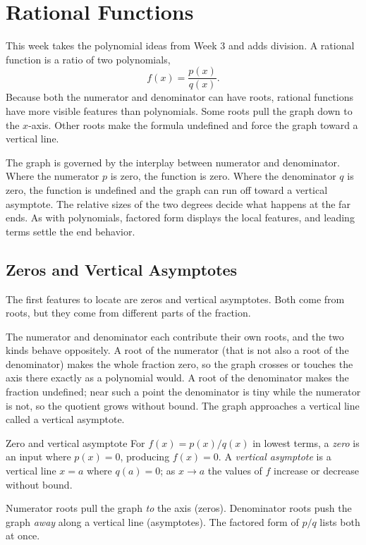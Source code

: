 \documentclass[12pt]{book}
\begin{document}
\chapter{Rational Functions}

This week takes the polynomial ideas from Week 3 and adds division. A rational
function is a ratio of two polynomials,
\[
f(x)=\frac{p(x)}{q(x)}.
\]
Because both the numerator and denominator can have roots, rational functions have
more visible features than polynomials. Some roots pull the graph down to the
$x$-axis. Other roots make the formula undefined and force the graph toward a
vertical line.

The graph is governed by the interplay between numerator and denominator. Where the
numerator $p$ is zero, the function is zero. Where the denominator $q$ is zero, the
function is undefined and the graph can run off toward a vertical asymptote. The
relative sizes of the two degrees decide what happens at the far ends. As with
polynomials, factored form displays the local features, and leading terms settle the
end behavior.

\section{Zeros and Vertical Asymptotes}

The first features to locate are zeros and vertical asymptotes. Both come from roots,
but they come from different parts of the fraction.

The numerator and denominator each contribute their own roots, and the two kinds
behave oppositely. A root of the numerator (that is not also a root of the
denominator) makes the whole fraction zero, so the graph crosses or touches the axis
there exactly as a polynomial would. A root of the denominator makes the fraction
undefined; near such a point the denominator is tiny while the numerator is not, so
the quotient grows without bound. The graph approaches a vertical line called a
vertical asymptote.

\begin{definition}{Zero and vertical asymptote}
For $f(x)=p(x)/q(x)$ in lowest terms, a \emph{zero} is an input where $p(x)=0$,
producing $f(x)=0$. A \emph{vertical asymptote} is a vertical line $x=a$ where
$q(a)=0$; as $x\to a$ the values of $f$ increase or decrease without bound.
\end{definition}

\begin{keyidea}
Numerator roots pull the graph \emph{to} the axis (zeros). Denominator roots push
the graph \emph{away} along a vertical line (asymptotes). The factored form of
$p/q$ lists both at once.
\end{keyidea}
\end{document}
